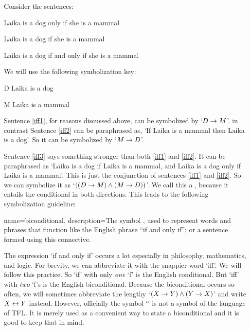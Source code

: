 Consider the sentences:
	\begin{earg}
		\item[\ex{iff1}] Laika is a dog only if she is a mammal
		\item[\ex{iff2}] Laika is a dog if she is a mammal
		\item[\ex{iff3}] Laika is a dog if and only if she is a mammal
	\end{earg}
We will use the following symbolization key:
	\begin{ekey}
		\item[D] Laika is a dog
		\item[M] Laika is a mammal
	\end{ekey}
Sentence \ref{iff1}, for reasons discussed above, can be symbolized by `$D \rightarrow M$'. in contrast Sentence \ref{iff2} can be paraphrased as, `If Laika is a mammal then Laika is a dog'. So it can be symbolized by `$M \rightarrow D$'.

Sentence \ref{iff3} says something stronger than both \ref{iff1} and \ref{iff2}. It can be paraphrased as `Laika is a dog if Laika is a mammal, and Laika is a dog only if Laika is a mammal'. This is just the conjunction of sentences \ref{iff1} and \ref{iff2}. So we can symbolize it as `$((D \rightarrow M) \mathbin{\wedge} (M \rightarrow D))$'. We call this a , because it entails the conditional in both directions. This leads to the following symbolization guideline:

{
name=biconditional,
description={The symbol \eiff, used to represent words and phrases that function like the English phrase ``if and only if''; or a sentence formed using this connective.}}


The expression `if and only if' occurs a lot especially in philosophy, mathematics, and logic. For brevity, we can abbreviate it with the snappier word `iff'. We will follow this practice. So `if' with only \emph{one} `f' is the English conditional. But `iff' with \emph{two} `f's is the English biconditional. Because the biconditional occurs so often, we will sometimes abbreviate the lengthy `$(X\rightarrow Y)\mathbin{\wedge}(Y\rightarrow X)$' and write $X\leftrightarrow Y$ instead. However, officially the symbol `\eiff' is not a symbol of the language of TFL. It is merely used as a convenient way to state a biconditional and it is good to keep that in mind.

